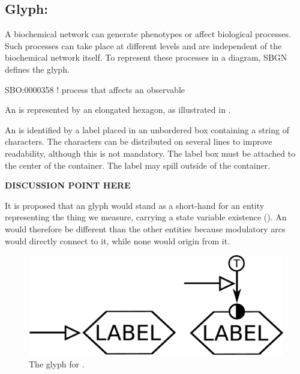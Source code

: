 
\color{red}

\subsection{Glyph: }
\label{sec:observable}

A biochemical network can generate phenotypes or affect biological
processes.  Such processes can take place at different levels and are
independent of the biochemical network itself.  To represent these
processes in a diagram, SBGN defines the  glyph.

\begin{glyphDescription}

\glyphSboTerm SBO:0000358 ! process that affects an observable

\glyphContainer An  is represented by an elongated
hexagon, as illustrated in .

\glyphLabel An  is identified by a label placed in an
unbordered box containing a string of characters.  The characters can be
distributed on several lines to improve readability, although this is not
mandatory.  The label box must be attached to the center of the
 container.  The label may spill outside of the container.

\textbf{DISCUSSION POINT HERE}

\glyphAux It is proposed that an  glyph would stand as a short-hand for an entity representing the thing we measure, carrying a state variable existence (). An  would therefore be different than the other entities because modulatory arcs would directly connect to it, while none would origin from it.
\end{glyphDescription}
 
\begin{figure}[H]
  \centering
  \includegraphics[scale = 0.3]{images/observable}
  \caption{The \ER glyph for .}
  \label{fig:observable}
\end{figure}

\normalcolor

